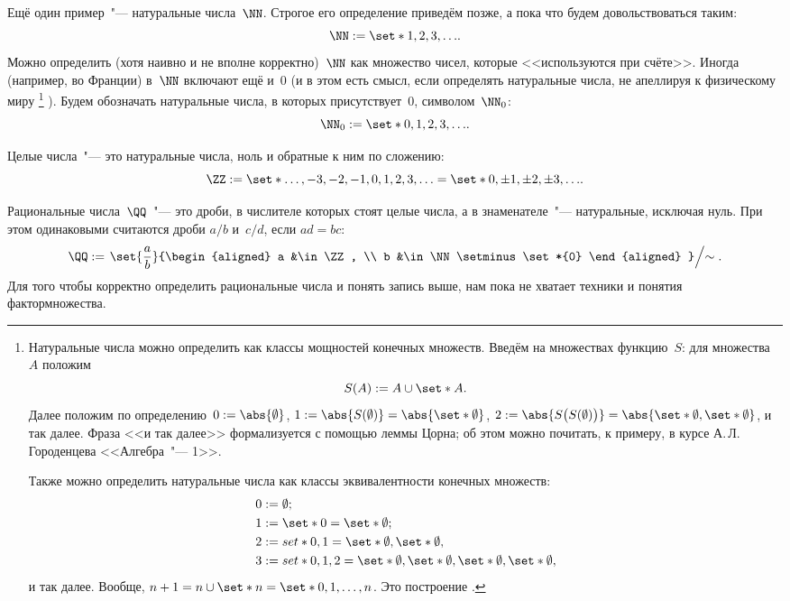 \begin{example}
	Ещё один пример~"--- натуральные числа~$\NN$. Строгое его определение приведём
	позже, а пока что будем довольствоваться таким:
	\[
		\NN := \set*{1, 2, 3, \dots}
		.
	\]
	Можно определить (хотя наивно и не вполне корректно)~$\NN$ как множество
	чисел, которые <<используются при счёте>>.  Иногда (например, во Франции)
	в~$\NN$ включают ещё и~$0$ (и в этом есть смысл, если определять натуральные
	числа, не апеллируя к физическому миру%
	\footnote{%
		Натуральные числа можно определить как классы мощностей конечных множеств.
		Введём на множествах функцию~$S$: для множества~$A$ положим
		\[
			S(A) := A \cup \set*{A}.
		\]
		Далее положим по определению~$0 := \abs{\emptyset}$, $1 :=
		\abs{S(\emptyset)} = \abs{\set*{\emptyset}}$, $2 := \abs{S \bigl(
		S(\emptyset) \bigr)} = \abs{\set*{\emptyset, \set*{\emptyset}}}$, и так
		далее. Фраза <<и так далее>> формализуется с помощью леммы Цорна; об этом можно почитать, к примеру, в курсе А.\,Л.\,Городенцева <<Алгебра~"--- 1>>.

		Также можно определить натуральные числа как классы эквивалентности конечных множеств:
		\begin{align*}
			0 &:= \emptyset;
			\\
			1 &:= \set*{0} = \set*{\emptyset};
			\\
			2 &:= set*{0, 1} = \set*{\emptyset, \set*{\emptyset}},
			\\
			3 &:= set*{0, 1, 2} = \set*{\emptyset, \set*{\emptyset}, \set*{\emptyset, \set*{\emptyset}}},
		\end{align*}
		и так далее. Вообще, $n + 1 = n \cup \set*{n} = \set*{0, 1, \dots, n}$. Это построение .
	}%
	). Будем обозначать натуральные числа, в которых присутствует~$0$, символом~$\NN_0$:
	\[
		\NN_0 := \set*{0, 1, 2, 3, \dots}
		.
	\]
\end{example}

\begin{example}
	Целые числа~"--- это натуральные числа, ноль и обратные к ним по сложению:
	\[
		\ZZ := \set*{\dots, -3, -2, -1, 0, 1, 2, 3, \dots} =
		\set*{0, \pm 1, \pm 2, \pm 3, \dots}.
	\]
\end{example}

\begin{example}
	Рациональные числа~$\QQ$~"--- это дроби, в числителе которых стоят целые
	числа, а в знаменателе~"--- натуральные, исключая нуль. При этом одинаковыми
	считаются дроби $a/b$ и~$c/d$, если $ad = bc$:
	\[
		\QQ :=
		\left.
			\set{\frac{a}{b}}{%
				\begin{aligned}
					a &\in \ZZ, \\
					b &\in \NN \setminus \set*{0}
				\end{aligned}
			}
		\middle/
			\sim
		\right.
		.
	\]
	Для того чтобы корректно определить рациональные числа и понять запись выше,
	нам пока не хватает техники и понятия фактормножества.
\end{example}

